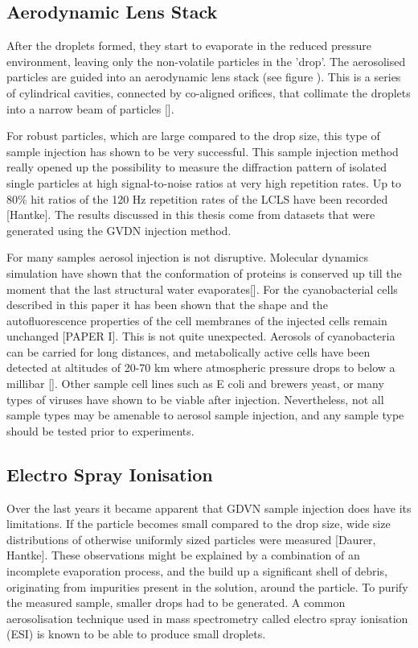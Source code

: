 \subsection{Aerodynamic Lens Stack}
After the droplets formed, they start to evaporate in the reduced pressure environment, leaving only the non-volatile particles in the 'drop'. The aerosolised particles are guided into an aerodynamic lens stack (see figure ). This is a series of cylindrical cavities, connected by co-aligned orifices, that collimate the droplets into a narrow beam of particles [].

For robust particles, which are large compared to the drop size, this type of sample injection has shown to be very successful. This sample injection method really opened up the possibility to measure the diffraction pattern of isolated single particles at high signal-to-noise ratios at very high repetition rates. Up to 80\% hit ratios of the 120 Hz repetition rates of the LCLS have been recorded [Hantke]. The results discussed in this thesis come from datasets that were generated using the GVDN injection method.

For many samples aerosol injection is not disruptive. Molecular dynamics simulation have shown that the conformation of proteins is conserved up till the moment that the last structural water evaporates[]. For the cyanobacterial cells described in this paper it has been shown that the shape and the autofluorescence properties of the cell membranes of the injected cells remain unchanged [PAPER I]. This is not quite unexpected. Aerosols of cyanobacteria can be carried for long distances, and metabolically active cells have been detected at altitudes of 20-70 km where atmospheric pressure drops to below a millibar []. Other sample cell lines such as E coli and brewers yeast, or many types of viruses have shown to be viable after injection. Nevertheless, not all sample types may be amenable to aerosol sample injection, and any sample type should be tested prior to experiments.  

\subsection{Electro Spray Ionisation}
Over the last years it became apparent that GDVN sample injection does have its limitations. If the particle becomes small compared to the drop size, wide size distributions of otherwise uniformly sized particles were measured [Daurer, Hantke]. These observations might be explained by a combination of an incomplete evaporation process, and the build up a significant shell of debris, originating from impurities present in the solution, around the particle. To purify the measured sample, smaller drops had to be generated. A common aerosolisation technique used in mass spectrometry called electro spray ionisation (ESI) is known to be able to produce small droplets.

